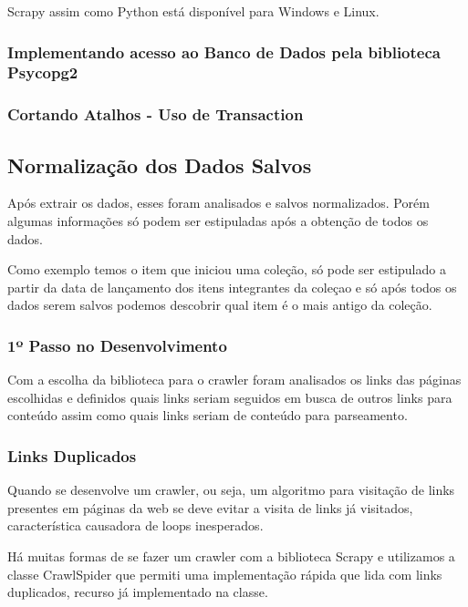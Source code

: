 \documentclass[12pt]{article}
\begin{document}
Scrapy assim como Python está disponível para Windows e Linux.


\subsubsection{Implementando acesso ao Banco de Dados pela biblioteca Psycopg2}


\subsubsection{Cortando Atalhos - Uso de Transaction}


\subsection{Normalização dos Dados Salvos}

Após extrair os dados, esses foram analisados e salvos normalizados. Porém algumas informações só podem ser estipuladas após a obtenção de todos os dados.

Como exemplo temos o item que iniciou uma coleção, só pode ser estipulado a partir da data de lançamento dos itens integrantes da coleçao e só após todos os dados serem salvos podemos descobrir qual item é o mais antigo da coleção.




\subsubsection{1º Passo no Desenvolvimento}

Com a escolha da biblioteca para o crawler foram analisados os links das páginas escolhidas e definidos quais links seriam seguidos em busca de outros links para conteúdo assim como quais links seriam de conteúdo para parseamento. 



\subsubsection{Links Duplicados}

Quando se desenvolve um crawler, ou seja, um algoritmo para visitação de links presentes em páginas da web se deve evitar a visita de links já visitados, característica causadora de loops inesperados. 

Há muitas formas de se fazer um crawler com a biblioteca Scrapy e utilizamos a classe CrawlSpider que permiti uma implementação rápida que lida com links duplicados, recurso já implementado na classe.
\end{document}
